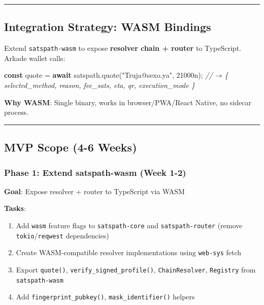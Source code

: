 \documentclass[
]{article}
\newenvironment{Shaded}{}{}
\newcommand{\CommentTok}[1]{\textcolor[rgb]{0.38,0.63,0.69}{\textit{#1}}}
\newcommand{\ControlFlowTok}[1]{\textcolor[rgb]{0.00,0.44,0.13}{\textbf{#1}}}
\newcommand{\DecValTok}[1]{\textcolor[rgb]{0.25,0.63,0.44}{#1}}
\newcommand{\FunctionTok}[1]{\textcolor[rgb]{0.02,0.16,0.49}{#1}}
\newcommand{\KeywordTok}[1]{\textcolor[rgb]{0.00,0.44,0.13}{\textbf{#1}}}
\newcommand{\NormalTok}[1]{#1}
\newcommand{\OperatorTok}[1]{\textcolor[rgb]{0.40,0.40,0.40}{#1}}
\newcommand{\StringTok}[1]{\textcolor[rgb]{0.25,0.44,0.63}{#1}}
\providecommand{\tightlist}{%
  \setlength{\itemsep}{0pt}\setlength{\parskip}{0pt}}
\begin{document}
\begin{center}\rule{0.5\linewidth}{0.5pt}\end{center}

\hypertarget{integration-strategy-wasm-bindings}{%
\subsection{Integration Strategy: WASM
Bindings}\label{integration-strategy-wasm-bindings}}

Extend \texttt{satspath-wasm} to expose \textbf{resolver chain + router}
to TypeScript. Arkade wallet calls:

\begin{Shaded}
\begin{Highlighting}[]
\KeywordTok{const}\NormalTok{ quote }\OperatorTok{=} \ControlFlowTok{await}\NormalTok{ satspath}\OperatorTok{.}\FunctionTok{quote}\NormalTok{(}\StringTok{"Truja@sexo.ya"}\OperatorTok{,} \DecValTok{21000}\NormalTok{n)}\OperatorTok{;}
\CommentTok{// → \{ selected\_method, reason, fee\_sats, eta, qr, execution\_mode \}}
\end{Highlighting}
\end{Shaded}

\textbf{Why WASM}: Single binary, works in browser/PWA/React Native, no
sidecar process.

\begin{center}\rule{0.5\linewidth}{0.5pt}\end{center}

\hypertarget{mvp-scope-4-6-weeks}{%
\subsection{MVP Scope (4-6 Weeks)}\label{mvp-scope-4-6-weeks}}

\hypertarget{phase-1-extend-satspath-wasm-week-1-2}{%
\subsubsection{Phase 1: Extend satspath-wasm (Week
1-2)}\label{phase-1-extend-satspath-wasm-week-1-2}}

\textbf{Goal}: Expose resolver + router to TypeScript via WASM

\textbf{Tasks}:

\begin{enumerate}
\def\labelenumi{\arabic{enumi}.}
\tightlist
\item
  Add \texttt{wasm} feature flags to \texttt{satspath-core} and
  \texttt{satspath-router} (remove \texttt{tokio}/\texttt{reqwest}
  dependencies)
\item
  Create WASM-compatible resolver implementations using \texttt{web-sys}
  fetch
\item
  Export \texttt{quote()}, \texttt{verify\_signed\_profile()},
  \texttt{ChainResolver}, \texttt{Registry} from \texttt{satspath-wasm}
\item
  Add \texttt{fingerprint\_pubkey()}, \texttt{mask\_identifier()}
  helpers
\end{enumerate}
\end{document}
